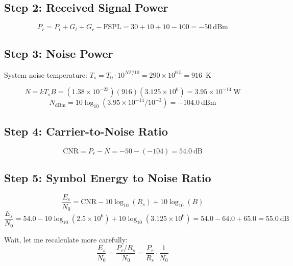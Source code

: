 \subsection*{Step 2: Received Signal Power}

\begin{equation}
P_r = P_t + G_t + G_r - \mathrm{FSPL} = 30 + 10 + 10 - 100 = -50~\text{dBm}
\end{equation}

\subsection*{Step 3: Noise Power}

System noise temperature: $T_s = T_0 \cdot 10^{NF/10} = 290 \times 10^{0.5} = 916$~K

\begin{equation}
N = kT_sB = (1.38 \times 10^{-23})(916)(3.125 \times 10^6) = 3.95 \times 10^{-14}~\text{W}
\end{equation}
\begin{equation}
N_{\text{dBm}} = 10\log_{10}(3.95 \times 10^{-14} / 10^{-3}) = -104.0~\text{dBm}
\end{equation}

\subsection*{Step 4: Carrier-to-Noise Ratio}

\begin{equation}
\mathrm{CNR} = P_r - N = -50 - (-104) = 54.0~\text{dB}
\end{equation}

\subsection*{Step 5: Symbol Energy to Noise Ratio}

\begin{equation}
\frac{E_s}{N_0} = \mathrm{CNR} - 10\log_{10}(R_s) + 10\log_{10}(B)
\end{equation}
\begin{equation}
\frac{E_s}{N_0} = 54.0 - 10\log_{10}(2.5 \times 10^6) + 10\log_{10}(3.125 \times 10^6) = 54.0 - 64.0 + 65.0 = 55.0~\text{dB}
\end{equation}

Wait, let me recalculate more carefully:
\begin{equation}
\frac{E_s}{N_0} = \frac{P_r/R_s}{N_0} = \frac{P_r}{R_s} \cdot \frac{1}{N_0}
\end{equation}

